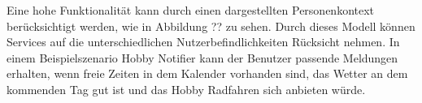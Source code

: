Eine hohe Funktionalität kann durch einen dargestellten Personenkontext berücksichtigt werden, wie in Abbildung ?? zu sehen. Durch dieses Modell können Services auf die unterschiedlichen Nutzerbefindlichkeiten Rücksicht nehmen. In einem Beispielszenario \glqq Hobby Notifier\grqq{} kann der Benutzer passende Meldungen erhalten, wenn freie Zeiten in dem Kalender vorhanden sind, das Wetter an dem kommenden Tag gut ist und das Hobby Radfahren sich anbieten würde.




